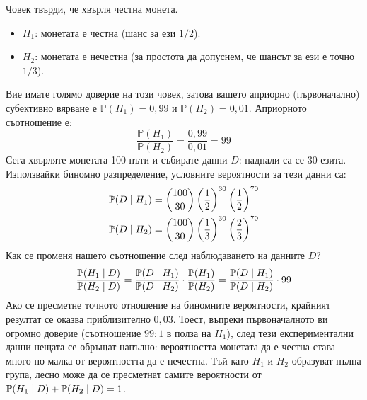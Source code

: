 \begin{example}\label{ex:03-4}

Човек твърди, че хвърля честна монета.
\begin{itemize}
    \item $H_1$: монетата е честна (шанс за ези $1/2$).
    \item $H_2$: монетата е нечестна (за простота да допуснем, че шансът за ези е точно $1/3$).
\end{itemize}
Вие имате голямо доверие на този човек, затова вашето априорно (първоначално) субективно вярване е $\mathbb{P}(H_1) = 0{,}99$ и $\mathbb{P}(H_2) = 0{,}01$. Априорното съотношение е:
\[
\frac{\mathbb{P}(H_1)}{\mathbb{P}(H_2)} = \frac{0{,}99}{0{,}01} = 99
\]
Сега хвърляте монетата 100 пъти и събирате данни $D$: паднали са се 30 езита. Използвайки биномно разпределение, условните вероятности за тези данни са:
\begin{align*}
\mathbb{P}(D \mid H_1) &= \binom{100}{30} \left(\frac{1}{2}\right)^{30} \left(\frac{1}{2}\right)^{70} \\
\mathbb{P}(D \mid H_2) &= \binom{100}{30} \left(\frac{1}{3}\right)^{30} \left(\frac{2}{3}\right)^{70}
\end{align*}
Как се променя нашето съотношение след наблюдаването на данните $D$?
\[
\frac{\mathbb{P}(H_1 \mid D)}{\mathbb{P}(H_2 \mid D)} = \frac{\mathbb{P}(D \mid H_1)}{\mathbb{P}(D \mid H_2)} \cdot \frac{\mathbb{P}(H_1)}{\mathbb{P}(H_2)} = \frac{\mathbb{P}(D \mid H_1)}{\mathbb{P}(D \mid H_2)} \cdot 99
\]
Ако се пресметне точното отношение на биномните вероятности, крайният резултат се оказва приблизително $0{,}03$. Тоест, въпреки първоначалното ви огромно доверие (съотношение $99:1$ в полза на $H_1$), след тези експериментални данни нещата се обръщат напълно: вероятността монетата да е честна става много по-малка от вероятността да е нечестна. Тъй като $H_1$ и $H_2$ образуват пълна група, лесно може да се пресметнат самите вероятности от $\mathbb{P}(H_1 \mid D) + \mathbb{P}(H_2 \mid D) = 1$.

\end{example}

